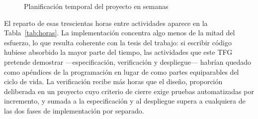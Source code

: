 \begin{figure}[htbp]
\centering
{}
\caption{Planificación temporal del proyecto en semanas}
\label{fig:gantt}
\end{figure}

El reparto de esas trescientas horas entre actividades aparece en la Tabla~\ref{tab:horas}. La implementación concentra algo menos de la mitad del esfuerzo, lo que resulta coherente con la tesis del trabajo: si escribir código hubiese absorbido la mayor parte del tiempo, las actividades que este TFG pretende demostrar ---especificación, verificación y despliegue--- habrían quedado como apéndices de la programación en lugar de como partes equiparables del ciclo de vida. La verificación recibe más horas que el diseño, proporción deliberada en un proyecto cuyo criterio de cierre exige pruebas automatizadas por incremento, y sumada a la especificación y al despliegue supera a cualquiera de las dos fases de implementación por separado.

